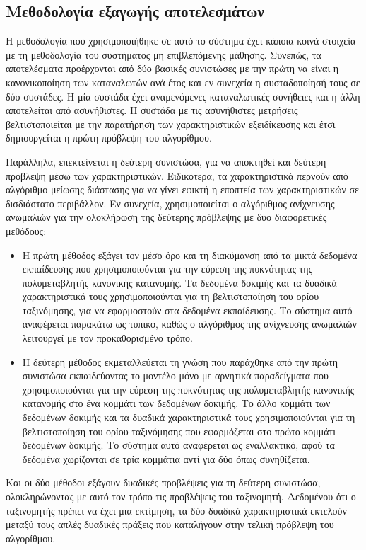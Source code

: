 \subsection{Μεθοδολογία εξαγωγής αποτελεσμάτων}
Η μεθοδολογία που χρησιμοποιήθηκε σε αυτό το σύστημα έχει κάποια κοινά στοιχεία με τη μεθοδολογία του συστήματος μη επιβλεπόμενης μάθησης. Συνεπώς, τα αποτελέσματα προέρχονται από δύο βασικές συνιστώσες με την πρώτη να είναι η κανονικοποίηση των καταναλωτών ανά έτος και εν συνεχεία η συσταδοποίησή τους σε δύο συστάδες. Η μία συστάδα έχει αναμενόμενες καταναλωτικές συνήθειες και η άλλη αποτελείται από ασυνήθιστες. H συστάδα με τις ασυνήθιστες μετρήσεις βελτιστοποιείται με την παρατήρηση των χαρακτηριστικών εξειδίκευσης και έτσι δημιουργείται η πρώτη πρόβλεψη του αλγορίθμου.\par
Παράλληλα, επεκτείνεται η δεύτερη συνιστώσα, για να αποκτηθεί και δεύτερη πρόβλεψη μέσω των χαρακτηριστικών. Ειδικότερα, τα χαρακτηριστικά περνούν από αλγόριθμο μείωσης διάστασης για να γίνει εφικτή η εποπτεία των χαρακτηριστικών σε δισδιάστατο περιβάλλον. Εν συνεχεία, χρησιμοποιείται ο αλγόριθμος ανίχνευσης ανωμαλιών για την ολοκλήρωση της δεύτερης πρόβλεψης με δύο διαφορετικές μεθόδους:
\begin{itemize}
\item Η πρώτη μέθοδος εξάγει τον μέσο όρο και τη διακύμανση από τα μικτά δεδομένα εκπαίδευσης που χρησιμοποιούνται για την εύρεση της πυκνότητας της πολυμεταβλητής κανονικής κατανομής. Τα δεδομένα δοκιμής και τα δυαδικά χαρακτηριστικά τους χρησιμοποιούνται για τη βελτιστοποίηση του ορίου ταξινόμησης, για να εφαρμοστούν στα δεδομένα εκπαίδευσης. Το σύστημα αυτό αναφέρεται παρακάτω ως τυπικό, καθώς ο αλγόριθμος της ανίχνευσης ανωμαλιών λειτουργεί με τον προκαθορισμένο τρόπο.
\item Η δεύτερη μέθοδος εκμεταλλεύεται τη γνώση που παράχθηκε από την πρώτη συνιστώσα εκπαιδεύοντας το μοντέλο μόνο με αρνητικά παραδείγματα που χρησιμοποιούνται για την εύρεση της πυκνότητας της πολυμεταβλητής κανονικής κατανομής στο ένα κομμάτι των δεδομένων δοκιμής. Το άλλο κομμάτι των δεδομένων δοκιμής και τα δυαδικά χαρακτηριστικά τους χρησιμοποιούνται για τη βελτιστοποίηση του ορίου ταξινόμησης που εφαρμόζεται στο πρώτο κομμάτι δεδομένων δοκιμής. Το σύστημα αυτό αναφέρεται ως εναλλακτικό, αφού τα δεδομένα χωρίζονται σε τρία κομμάτια αντί για δύο όπως συνηθίζεται.
\end{itemize}
\par Και οι δύο μέθοδοι εξάγουν δυαδικές προβλέψεις για τη δεύτερη συνιστώσα, ολοκληρώνοντας με αυτό τον τρόπο τις προβλέψεις του ταξινομητή. Δεδομένου ότι ο ταξινομητής πρέπει να έχει μια εκτίμηση, τα δύο δυαδικά χαρακτηριστικά εκτελούν μεταξύ τους απλές δυαδικές πράξεις που καταλήγουν στην τελική πρόβλεψη του αλγορίθμου.
